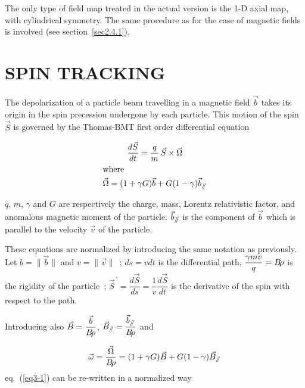 \noindent The only type of field map treated in the actual version is the 
1-D axial map, with cylindrical symmetry. The same procedure as 
for the case of magnetic fields is involved (see section~\ref{sec2.4.1}). 


\clearemptydoublepage

\section[SPIN TRACKING]{SPIN TRACKING~\protect\cite{Biblio7}}\label{sec3}   %

\renewcommand\theequation{\thesection.\arabic{equation}}
\makeatletter
{}
\makeatother

The depolarization of a particle beam travelling in a 
magnetic field $ \vec  b $ takes its origin in the spin  
precession undergone by each particle. This motion of the spin $ \vec  S $ 
is governed by the Thomas-BMT first order differential equation~\cite{Biblio8}       %


\begin{gather}
	\dfrac{d\vec  S }{ dt} = \dfrac{q }{  m} \, \vec  S\times\vec  \Omega
	     \label{eq3-1}  \\
\intertext{where}
	\vec  \Omega  = (1+\gamma G)\vec  b + G(1-\gamma )\vec  b_{\mathrel{/\kern-.25em/}} \label{eq3-2} 
\end{gather}

\noindent$ q$, $m$, $\gamma$ and $ G $ are respectively the charge, 
mass, Lorentz relativistic factor, and anomalous magnetic moment of the 
particle. $ \vec  b_{\mathrel{/\kern-.25em/}} $ is the component of $ \vec  b $ which is
parallel to the velocity $ \vec  v $ of the particle. 

\noindent These equations are normalized by introducing the same notation 
as previously. Let $ b=\parallel\vec  b\parallel $ and $ v=\parallel\vec v\parallel$~;  
$ ds=vdt $ is the differential path, $ \dfrac{\gamma mv }{ q} = B\!\rho $ is the
rigidity of the particle~; 
$ \vec  S^{\,\prime} = \dfrac{d\vec  S }{ ds} = \dfrac{1 }{ v}\dfrac{d\vec  S }{ dt} $ 
is the derivative of the spin with respect to the path. 

\noindent Introducing also $ \vec  B= \dfrac{\vec  b }{ B\!\rho} $, 
$ \vec B_{\mathrel{/\kern-.25em/}} = \dfrac{\vec  b_{\mathrel{/\kern-.25em/}} }{ B\!\rho} $  and

\begin{equation}
	\vec  \omega  = \frac{\vec \Omega }{ B\!\rho}  = (1+\gamma G)\vec  B +
	G(1-\gamma )\vec  B_{\mathrel{/\kern-.25em/}}
	\label{eq3-3}
\end{equation}
%
eq.~(\ref{eq3-1}) can be re-written in a normalized way

